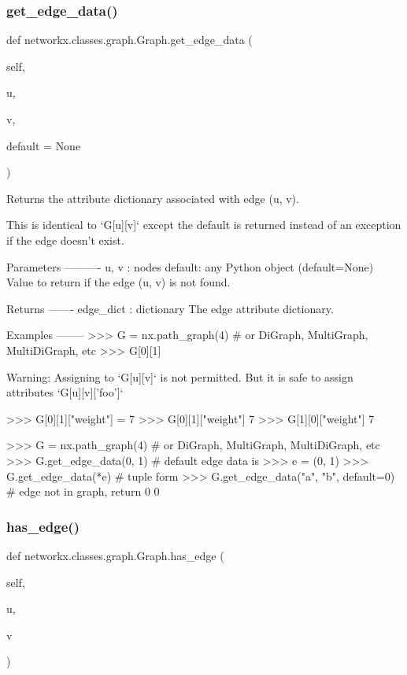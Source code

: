 \subsubsection{\texorpdfstring{get\+\_\+edge\+\_\+data()}{get\_edge\_data()}}
{\footnotesize\ttfamily def networkx.\+classes.\+graph.\+Graph.\+get\+\_\+edge\+\_\+data (\begin{DoxyParamCaption}\item[{}]{self,  }\item[{}]{u,  }\item[{}]{v,  }\item[{}]{default = {\ttfamily None} }\end{DoxyParamCaption})}

\begin{DoxyVerb}Returns the attribute dictionary associated with edge (u, v).

This is identical to `G[u][v]` except the default is returned
instead of an exception if the edge doesn't exist.

Parameters
----------
u, v : nodes
default:  any Python object (default=None)
    Value to return if the edge (u, v) is not found.

Returns
-------
edge_dict : dictionary
    The edge attribute dictionary.

Examples
--------
>>> G = nx.path_graph(4)  # or DiGraph, MultiGraph, MultiDiGraph, etc
>>> G[0][1]
{}

Warning: Assigning to `G[u][v]` is not permitted.
But it is safe to assign attributes `G[u][v]['foo']`

>>> G[0][1]["weight"] = 7
>>> G[0][1]["weight"]
7
>>> G[1][0]["weight"]
7

>>> G = nx.path_graph(4)  # or DiGraph, MultiGraph, MultiDiGraph, etc
>>> G.get_edge_data(0, 1)  # default edge data is {}
{}
>>> e = (0, 1)
>>> G.get_edge_data(*e)  # tuple form
{}
>>> G.get_edge_data("a", "b", default=0)  # edge not in graph, return 0
0
\end{DoxyVerb}
 \mbox{\label{classnetworkx_1_1classes_1_1graph_1_1Graph_a125d2a5df7ca7e64b5c71971d69a5dea}} 
\subsubsection{\texorpdfstring{has\+\_\+edge()}{has\_edge()}}
{\footnotesize\ttfamily def networkx.\+classes.\+graph.\+Graph.\+has\+\_\+edge (\begin{DoxyParamCaption}\item[{}]{self,  }\item[{}]{u,  }\item[{}]{v }\end{DoxyParamCaption})}

